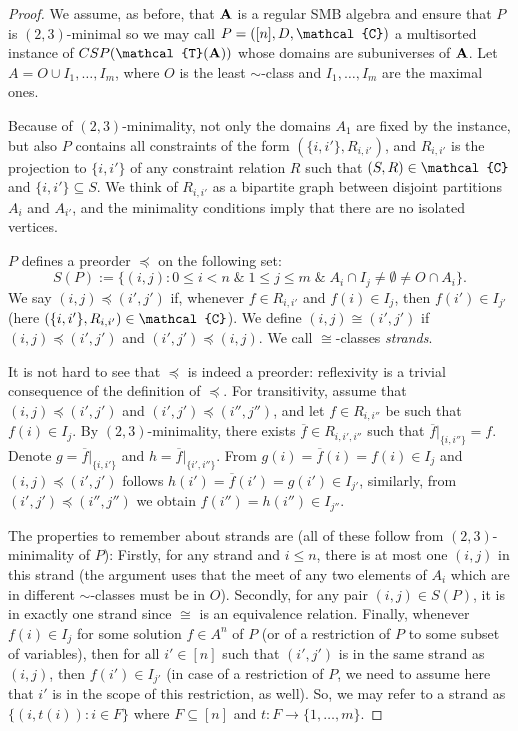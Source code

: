 \documentclass[11pt]{amsart}
\newcommand{\m}[1]{{\uppercase {\mathbf {#1}}}}
\newcommand{\vr}[1]{{\uppercase {\mathcal{#1}}}}
\newcommand{\usub}{\subseteq}
\theoremstyle{definition}
\begin{document}
\begin{proof}
We assume, as before, that $\m a$ is a regular SMB algebra and ensure that $P$ is $(2,3)$-minimal so we may call $P=([n],D,\vr c)$ a multisorted instance of $CSP(\vr t(\m a))$ whose domains are subuniverses of $\m a$. Let $A=O\cup I_1,\ldots,I_m$, where $O$ is the least $\sim$-class and $I_1,\ldots,I_m$ are the maximal ones. 

Because of $(2,3)$-minimality, not only the domains $A_1$ are fixed by the instance, but also $P$ contains all constraints of the form $(\{i,i'\},R_{i,i'})$, and $R_{i,i'}$ is the projection to $\{i,i'\}$ of any constraint relation $R$ such that $(S,R)\in \vr c$ and $\{i,i'\}\subseteq S$. We think of $R_{i,i'}$ as a bipartite graph between disjoint partitions $A_i$ and $A_{i'}$, and the minimality conditions imply that there are no isolated vertices.

$P$ defines a preorder $\preceq$ on the following set: 
$$S(P):=\{(i,j):0\leq i<n \;\&\; 1\leq j\leq m \;\&\; A_i\cap I_j\neq\emptyset\neq O\cap A_i\}.$$ 
We say $(i,j)\preceq(i',j')$ if, whenever $f\in R_{i,i'}$ and $f(i)\in I_j$, then $f(i')\in I_{j'}$ (here $(\{i,i'\},R_{i,i'})\in\vr c$). We define $(i,j)\cong(i',j')$ if $(i,j)\preceq(i',j')$ and $(i',j')\preceq(i,j)$. We call $\cong$-classes {\em strands}.

It is not hard to see that $\preceq$ is indeed a preorder: reflexivity is a trivial consequence of the definition of $\preceq$. For transitivity, assume that $(i,j)\preceq(i',j')$ and $(i',j')\preceq(i'',j'')$, and let $f\in R_{i,i''}$ be such that $f(i)\in I_j$. By $(2,3)$-minimality, there exists $\overline{f}\in R_{i,i',i''}$ such that $\overline{f}|_{\{i,i''\}}=f$. Denote $g=\overline{f}|_{\{i,i'\}}$ and $h=\overline{f}|_{\{i',i''\}}$. From $g(i)=\overline{f}(i)=f(i)\in I_j$ and $(i,j)\preceq(i',j')$ follows $h(i')=\overline{f}(i')=g(i')\in I_{j'}$, similarly, from $(i',j')\preceq(i'',j'')$ we obtain $f(i'')=h(i'')\in I_{j''}$.

The properties to remember about strands are (all of these follow from $(2,3)$-minimality of $P$): Firstly, for any strand and $i\leq n$, there is at most one $(i,j)$ in this strand (the argument uses that the meet of any two elements of $A_i$ which are in different $\sim$-classes must be in $O$). Secondly, for any pair $(i,j)\in S(P)$, it is in exactly one strand since $\cong$ is an equivalence relation. Finally, whenever $f(i)\in I_j$ for some solution $f\in A^n$ of $P$ (or of a restriction of $P$ to some subset of variables), then for all $i'\in[n]$ such that $(i',j')$ is in the same strand as $(i,j)$, then $f(i')\in I_{j'}$ (in case of a restriction of $P$, we need to assume here that $i'$ is in the scope of this restriction, as well). So, we may refer to a strand as $\{(i,t(i)):i\in F\}$ where $F\usub [n]$ and $t:F\rightarrow \{1,\ldots,m\}$.


\end{proof}
\end{document}
